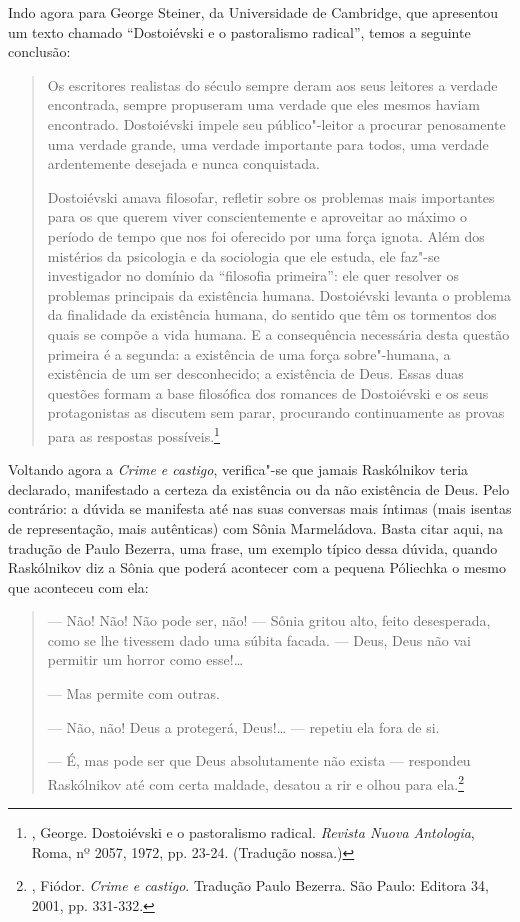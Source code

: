 Indo agora para George Steiner, da Universidade de Cambridge, que
apresentou um texto chamado ``Dostoiévski e o pastoralismo radical'',
temos a seguinte conclusão:

\begin{quotation}
Os escritores realistas do século  sempre deram aos seus leitores a
verdade encontrada, sempre propuseram uma verdade que eles mesmos haviam
encontrado. Dostoiévski impele seu público"-leitor a procurar penosamente
uma verdade grande, uma verdade importante para todos, uma verdade
ardentemente desejada e nunca conquistada.

Dostoiévski amava filosofar, refletir sobre os problemas mais
importantes para os que querem viver conscientemente e aproveitar ao
máximo o período de tempo que nos foi oferecido por uma força ignota.
Além dos mistérios da psicologia e da sociologia que ele estuda, ele
faz"-se investigador no domínio da ``filosofia primeira'': ele quer
resolver os problemas principais da existência humana. Dostoiévski
levanta o problema da finalidade da existência humana, do sentido que
têm os tormentos dos quais se compõe a vida humana. E a consequência
necessária desta questão primeira é a segunda: a existência de uma força
sobre"-humana, a existência de um ser desconhecido; a existência de Deus.
Essas duas questões formam a base filosófica dos romances de Dostoiévski
e os seus protagonistas as discutem sem parar, procurando continuamente
as provas para as respostas possíveis.\footnote{, George.
Dostoiévski e o pastoralismo radical. \emph{Revista Nuova Antologia}, Roma, nº 2057, 1972, pp. 23-24. (Tradução nossa.)}
\end{quotation}

Voltando agora a \emph{Crime e castigo}, verifica"-se que jamais
Raskólnikov teria declarado, manifestado a certeza da existência ou da
não existência de Deus. Pelo contrário: a dúvida se manifesta até nas
suas conversas mais íntimas (mais isentas de representação, mais
autênticas) com Sônia Marmeládova. Basta citar aqui, na tradução de
Paulo Bezerra, uma frase, um exemplo típico dessa dúvida, quando
Raskólnikov diz a Sônia que poderá acontecer com a pequena Póliechka o
mesmo que aconteceu com ela:

\begin{quotation}
--- Não! Não! Não pode ser, não! --- Sônia gritou alto, feito desesperada,
como se lhe tivessem dado uma súbita facada. --- Deus, Deus não vai
permitir um horror como esse!\ldots{}

--- Mas permite com outras.

--- Não, não! Deus a protegerá, Deus!\ldots{} --- repetiu ela fora de si.

--- É, mas pode ser que Deus absolutamente não exista --- respondeu
Raskólnikov até com certa maldade, desatou a rir e olhou para
ela.\footnote{, Fiódor. \emph{Crime e castigo}. Tradução
Paulo Bezerra. São Paulo: Editora 34, 2001, pp. 331-332.}
\end{quotation}

